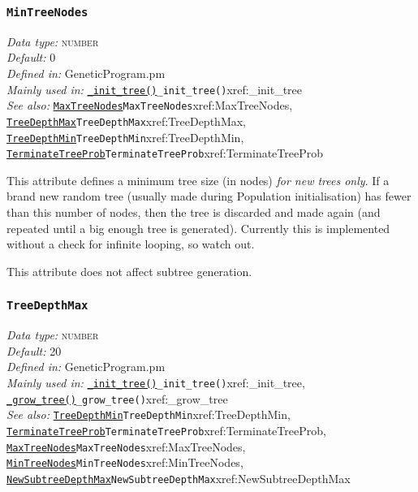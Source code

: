 \documentclass[a4paper]{article}
\begin{document}
\subsubsection{\texttt{MinTreeNodes}}\label{xref:MinTreeNodes}
\begin{flushleft}
\textit{Data type:} \textsc{number}\\
\textit{Default:} 0\\
\textit{Defined in:} GeneticProgram.pm\\
\textit{Mainly used in:} \hyperref[no]{\texttt{\_init\_tree()}}{\texttt{\_init\_tree()}}{xref:_init_tree}\\
\textit{See also:} \hyperref[no]{\texttt{MaxTreeNodes}}{\texttt{MaxTreeNodes}}{xref:MaxTreeNodes}, \hyperref[no]{\texttt{TreeDepthMax}}{\texttt{TreeDepthMax}}{xref:TreeDepthMax}, \hyperref[no]{\texttt{TreeDepthMin}}{\texttt{TreeDepthMin}}{xref:TreeDepthMin}, \hyperref[no]{\texttt{TerminateTreeProb}}{\texttt{TerminateTreeProb}}{xref:TerminateTreeProb}
\end{flushleft}

This attribute defines a minimum tree size (in nodes) \textit{for new
trees only}.  If a brand new random tree (usually made during
Population initialisation) has fewer than this number of nodes, then the
tree is discarded and made again (and repeated until a big enough tree
is generated).  Currently this is implemented without a check for
infinite looping, so watch out.

This attribute does not affect subtree generation.

\subsubsection{\texttt{TreeDepthMax}}\label{xref:TreeDepthMax}
\begin{flushleft}
\textit{Data type:} \textsc{number}\\
\textit{Default:} 20\\
\textit{Defined in:} GeneticProgram.pm\\
\textit{Mainly used in:} \hyperref[no]{\texttt{\_init\_tree()}}{\texttt{\_init\_tree()}}{xref:_init_tree}, \hyperref[no]{\texttt{\_grow\_tree()}}{\texttt{\_grow\_tree()}}{xref:_grow_tree}\\
\textit{See also:} \hyperref[no]{\texttt{TreeDepthMin}}{\texttt{TreeDepthMin}}{xref:TreeDepthMin}, \hyperref[no]{\texttt{TerminateTreeProb}}{\texttt{TerminateTreeProb}}{xref:TerminateTreeProb}, \hyperref[no]{\texttt{MaxTreeNodes}}{\texttt{MaxTreeNodes}}{xref:MaxTreeNodes}, \hyperref[no]{\texttt{MinTreeNodes}}{\texttt{MinTreeNodes}}{xref:MinTreeNodes}, \hyperref[no]{\texttt{NewSubtreeDepthMax}}{\texttt{NewSubtreeDepthMax}}{xref:NewSubtreeDepthMax}
\end{flushleft}
\end{document}
